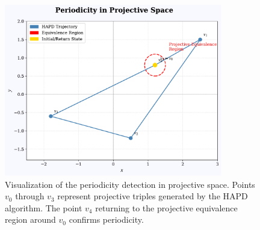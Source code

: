 
\begin{figure}[ht]
\centering
\includegraphics[width=0.85\textwidth]{../figures/output/projective_periodicity_visualization.pdf}

\caption{Visualization of the periodicity detection in projective space. Points $v_0$ through $v_3$ represent projective triples generated by the HAPD algorithm. The point $v_4$ returning to the projective equivalence region around $v_0$ confirms periodicity.}
\label{fig:projective_visualization}
\end{figure} 